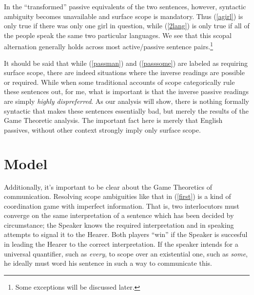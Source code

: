 \documentclass{article}
\begin{document}
In the ``transformed'' passive equivalents of the two sentences, however, syntactic ambiguity becomes unavailable and surface scope is mandatory.
Thus (\ref{agirl}) is only true if there was only one girl in question, while (\ref{2lang}) is only true if all of the people speak the same two particular languages.
We see that this scopal alternation generally holds across most active/passive sentence pairs.\footnote{Some exceptions will be discussed later.}

\begin{exe}
\end{exe}

It should be said that while (\ref{passman}) and (\ref{passsome}) are labeled as requiring surface scope, there are indeed situations where the inverse readings are possible or required.
While when some traditional accounts of scope categorically rule these sentences out, for me, what is important is that the inverse passive readings are simply \emph{highly dispreferred}.
As our analysis will show, there is nothing formally syntactic that makes these sentences essentially bad, but merely the results of the Game Theoretic analysis.
The important fact here is merely that English passives, without other context strongly imply only surface scope.


\section{Model}

Additionally, it's important to be clear about the Game Theoretics of communication.
Resolving scope ambiguities like that in (\ref{first}) is a kind of coordination game with imperfect information.
That is, two interlocutors must converge on the same interpretation of a sentence which has been decided by circumstance;
the Speaker knows the required interpretation and in speaking attempts to signal it to the Hearer.
Both players ``win'' if the Speaker is succesful in leading the Hearer to the correct interpretation.
If the speaker intends for a universal quantifier, such as \emph{every}, to scope over an existential one, such as \emph{some}, he ideally must word his sentence in such a way to communicate this.
\end{document}
